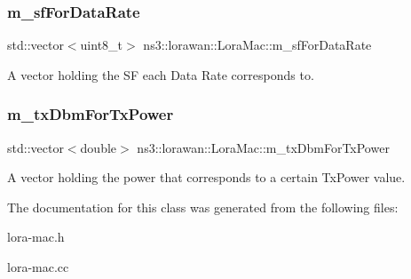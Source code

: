 \subsubsection{\texorpdfstring{m\+\_\+sf\+For\+Data\+Rate}{m\_sfForDataRate}}
{\footnotesize\ttfamily std\+::vector$<$uint8\+\_\+t$>$ ns3\+::lorawan\+::\+Lora\+Mac\+::m\+\_\+sf\+For\+Data\+Rate\hspace{0.3cm}{\ttfamily [protected]}}

A vector holding the SF each Data Rate corresponds to. \mbox{\label{classns3_1_1lorawan_1_1LoraMac_a3b34787f91543563ad0b989fe067120b}} 
\subsubsection{\texorpdfstring{m\+\_\+tx\+Dbm\+For\+Tx\+Power}{m\_txDbmForTxPower}}
{\footnotesize\ttfamily std\+::vector$<$double$>$ ns3\+::lorawan\+::\+Lora\+Mac\+::m\+\_\+tx\+Dbm\+For\+Tx\+Power\hspace{0.3cm}{\ttfamily [protected]}}

A vector holding the power that corresponds to a certain Tx\+Power value. 

The documentation for this class was generated from the following files\+:\begin{DoxyCompactItemize}
\item 
lora-\/mac.\+h\item 
lora-\/mac.\+cc\end{DoxyCompactItemize}
